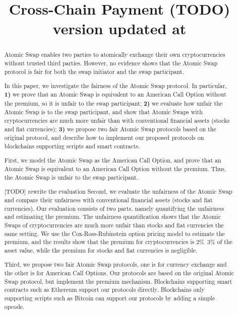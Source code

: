 \documentclass[sigconf, natbib=false]{acmart}
\renewcommand\_{\textunderscore\allowbreak}
\newcommand{\TODO}[1]{{\color{red} [TODO] #1}}
\begin{document}
\title{
    Cross-Chain Payment (TODO) \\
    {\normalsize \normalfont version updated at \DTMnow }
}

\begin{abstract}
Atomic Swap enables two parties to atomically exchange their own cryptocurrencies without trusted third parties.
However, no evidence shows that the Atomic Swap protocol is fair for both the swap initiator and the swap participant.

In this paper, we investigate the fairness of the Atomic Swap protocol.
In particular,
\textbf{1)} we prove that an Atomic Swap is equivalent to an American Call Option without the premium, so it is unfair to the swap participant;
\textbf{2)} we evaluate how unfair the Atomic Swap is to the swap participant, and show that Atomic Swaps with cryptocurrencies are much more unfair than with conventional financial assets (stocks and fiat currencies);
\textbf{3)} we propose two fair Atomic Swap protocols based on the original protocol, and describe how to implement our proposed protocols on blockchains supporting scripts and smart contracts. 

First, we model the Atomic Swap as the American Call Option,
and prove that an Atomic Swap is equivalent to an American Call Option without the premium.
Thus, the Atomic Swap is unfair to the swap participant.

\TODO{rewrite the evaluation}
Second, we evaluate the unfairness of the Atomic Swap and compare their unfairness with conventional financial assets (stocks and fiat currencies).
Our evaluation consists of two parts, namely quantifying the unfairness and estimating the premium.
The unfairness quantification shows that the Atomic Swaps of cryptocurrencies are much more unfair than stocks and fiat currencies the same setting.
We use the Cox-Ross-Rubinstein option pricing model to estimate the premium, and the results show that the premium for cryptocurrencies is 2\%~3\% of the asset value, while the premium for stocks and fiat currencies is negligible.

Third, we propose two fair Atomic Swap protocols,
one is for currency exchange and the other is for American Call Options.
Our protocols are based on the original Atomic Swap protocol, but implement the premium mechanism.
Blockchains supporting smart contracts such as Ethereum support our protocols directly.
Blockchains only supporting scripts such as Bitcoin can support our protocols by adding a simple opcode.
\end{abstract}
\end{document}
